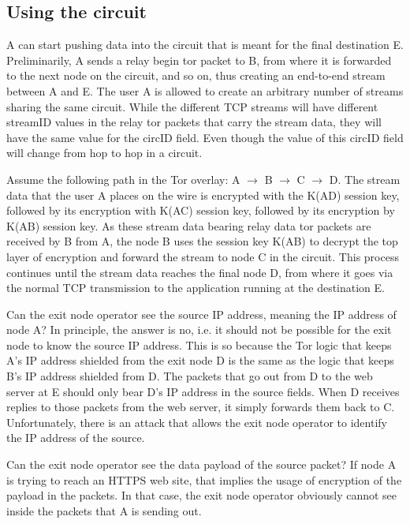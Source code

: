 \subsection{Using the circuit}


A can start pushing data into the circuit that is meant for the final destination E. Preliminarily, A sends a relay begin tor packet to B, from where it is forwarded to the next node on the circuit, and so on, thus creating an end-to-end stream between A and E. The user A is allowed to create an arbitrary number of streams sharing the same circuit. While the different TCP streams will have different streamID values in the relay
tor packets that carry the stream data, they will have the same value for the circID field. Even though the value of this circID field will change from hop to hop in a circuit.

Assume the following path in the Tor overlay: A $\rightarrow$ B $\rightarrow$ C $\rightarrow$ D. The stream data that the user A places on the wire is encrypted with the K(AD) session key, followed by its encryption with K(AC) session key, followed by its encryption by K(AB) session key. As these stream data bearing relay data tor packets are received by B from A, the node B uses the session key K(AB) to decrypt the top layer of encryption and forward the stream to node C in the circuit. This process continues until the stream data reaches the final node D, from where it goes via the normal TCP transmission to the application running at the destination E.

Can the exit node operator see the source IP address, meaning the IP address of node A? In principle, the answer is no, i.e. it should not be possible for the exit node to know the source IP address. This is so because the Tor logic that keeps A’s IP address shielded from the exit node D is the same as the logic that keeps B’s IP address shielded from D. The packets that go out from D to the web server at E should only bear D’s IP address in the source fields. When D receives replies to those packets from the web server, it simply forwards them back to C. Unfortunately, there is an attack that allows the exit node operator to identify the IP address of the source.

Can the exit node operator see the data payload of the source packet? If node A is trying to reach an HTTPS web site, that implies the usage of encryption of the payload in the packets. In that case, the exit node operator obviously cannot see inside the packets that A is sending out.